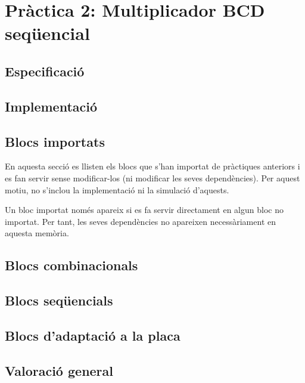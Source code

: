 \chapter{Pràctica 2: Multiplicador BCD seqüencial}

\section{Especificació}

\section{Implementació}


\section{Blocs importats}

En aquesta secció es llisten els blocs que s'han importat de pràctiques
anteriors i es fan servir sense modificar-los (ni modificar les seves
dependències). Per aquest motiu, no s'inclou la implementació ni la
simulació d'aquests.

Un bloc importat només apareix si es fa servir directament en algun bloc
no importat. Per tant, les seves dependències no apareixen necessàriament
en aquesta memòria.


\section{Blocs combinacionals}

\section{Blocs seqüencials}

\section{Blocs d'adaptació a la placa}

\section{Valoració general}


